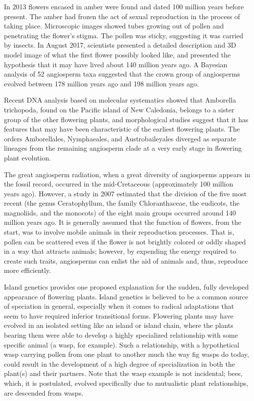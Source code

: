 In 2013 flowers encased in amber were found and dated 100 million years before present. The amber had frozen the act of sexual reproduction in the process of taking place. Microscopic images showed tubes growing out of pollen and penetrating the flower's stigma. The pollen was sticky, suggesting it was carried by insects. In August 2017, scientists presented a detailed description and 3D model image of what the first flower possibly looked like, and presented the hypothesis that it may have lived about 140 million years ago. A Bayesian analysis of 52 angiosperm taxa suggested that the crown group of angiosperms evolved between 178 million years ago and 198 million years ago.

Recent DNA analysis based on molecular systematics showed that Amborella trichopoda, found on the Pacific island of New Caledonia, belongs to a sister group of the other flowering plants, and morphological studies suggest that it has features that may have been characteristic of the earliest flowering plants. The orders Amborellales, Nymphaeales, and Austrobaileyales diverged as separate lineages from the remaining angiosperm clade at a very early stage in flowering plant evolution.

The great angiosperm radiation, when a great diversity of angiosperms appears in the fossil record, occurred in the mid-Cretaceous (approximately 100 million years ago). However, a study in 2007 estimated that the division of the five most recent (the genus Ceratophyllum, the family Chloranthaceae, the eudicots, the magnoliids, and the monocots) of the eight main groups occurred around 140 million years ago. It is generally assumed that the function of flowers, from the start, was to involve mobile animals in their reproduction processes. That is, pollen can be scattered even if the flower is not brightly colored or oddly shaped in a way that attracts animals; however, by expending the energy required to create such traits, angiosperms can enlist the aid of animals and, thus, reproduce more efficiently.

Island genetics provides one proposed explanation for the sudden, fully developed appearance of flowering plants. Island genetics is believed to be a common source of speciation in general, especially when it comes to radical adaptations that seem to have required inferior transitional forms. Flowering plants may have evolved in an isolated setting like an island or island chain, where the plants bearing them were able to develop a highly specialized relationship with some specific animal (a wasp, for example). Such a relationship, with a hypothetical wasp carrying pollen from one plant to another much the way fig wasps do today, could result in the development of a high degree of specialization in both the plant(s) and their partners. Note that the wasp example is not incidental; bees, which, it is postulated, evolved specifically due to mutualistic plant relationships, are descended from wasps.

